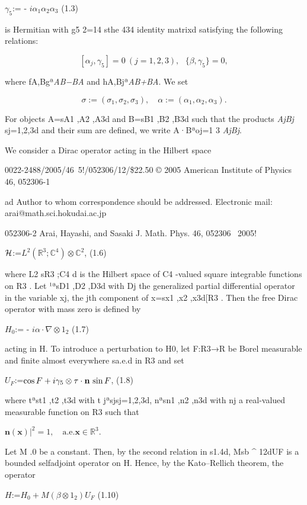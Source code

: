 \documentclass{article}
\begin{document}
$\gamma_{5}$:= - $i\alpha_{1}\alpha_{2}\alpha_{3}$ (1.3)

is Hermitian with g5 2=14 sthe 434 identity matrixd satisfying the following relations:

$$[\alpha_{j},\gamma_{5}]=0\ (j=1,2,3),\ \ \ \{\beta,\gamma_{5}\}=0,\tag{1.4}$$

where fA,Bgª\textit{AB−BA} and hA,Bjª\textit{AB+BA}. We set

$$\sigma:=(\sigma_{1},\sigma_{2},\sigma_{3}),\quad\alpha:=(\alpha_{1},\alpha_{2},\alpha_{3}).\tag{1.5}$$

For objects A=sA1 ,A2 ,A3d and B=sB1 ,B2 ,B3d such that the products \textit{AjBj} sj=1,2,3d and their sum are defined, we write A·Bªoj=1 3 \textit{AjBj}.

We consider a Dirac operator acting in the Hilbert space

0022-2488/2005/46~5!/052306/12/\$22.50 © 2005 American Institute of Physics 46, 052306-1

ad Author to whom correspondence should be addressed. Electronic mail: arai@math.sci.hokudai.ac.jp

052306-2 Arai, Hayashi, and Sasaki J. Math. Phys. 46, 052306 ~2005!

${\cal H}$:=$L^{2}({\mathbb{R}}^{3};{\mathbb{C}}^{4})\otimes{\mathbb{C}}^{2}$, (1.6)

where L2 sR3 ;C4 d is the Hilbert space of C4 -valued square integrable functions on R3 . Let ¹ªsD1 ,D2 ,D3d with Dj the generalized partial differential operator in the variable xj, the jth component of x=sx1 ,x2 ,x3d[R3 . Then the free Dirac operator with mass zero is defined by

$H_{0}$:= - $i\alpha\cdot\nabla\otimes1_{2}$ (1.7)

acting in H. To introduce a perturbation to H0, let F:R3→R be Borel measurable and finite almost everywhere sa.e.d in R3 and set

$U_{F}$:=$\cos F+i\gamma_{5}\otimes\tau\cdot{\bf n}\,\sin F$, (1.8)

where tªst1 ,t2 ,t3d with t jªsjsj=1,2,3d, nªsn1 ,n2 ,n3d with nj a real-valued measurable function on R3 such that

$\mathbf{n(x)}|^{2}=1,\quad\text{a.e.}\mathbf{x}\in\mathbb{R}^{3}.$

Let M .0 be a constant. Then, by the second relation in s1.4d, Msb ^ 12dUF is a bounded selfadjoint operator on H. Hence, by the Kato–Rellich theorem, the operator

$H$:=$H_{0}+M(\beta\otimes1_{2})U_{F}$ (1.10)
\end{document}

